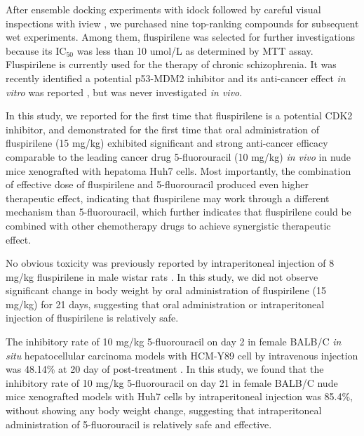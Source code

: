 \documentclass[10pt]{article}
\begin{document}
After ensemble docking experiments with idock \cite{1153,1362} followed by careful visual inspections with iview \cite{1366}, we purchased nine top-ranking compounds for subsequent wet experiments. Among them, fluspirilene was selected for further investigations because its IC$_{50}$ was less than 10 umol/L as determined by MTT assay. Fluspirilene is currently used for the therapy of chronic schizophrenia. It was recently identified a potential p53-MDM2 inhibitor and its anti-cancer effect \textit{in vitro} was reported \cite{1606}, but was never investigated \textit{in vivo}.

In this study, we reported for the first time that fluspirilene is a potential CDK2 inhibitor, and demonstrated for the first time that oral administration of fluspirilene (15 mg/kg) exhibited significant and strong anti-cancer efficacy comparable to the leading cancer drug 5-fluorouracil (10 mg/kg) \textit{in vivo} in nude mice xenografted with hepatoma Huh7 cells. Most importantly, the combination of effective dose of fluspirilene and 5-fluorouracil produced even higher therapeutic effect, indicating that fluspirilene may work through a different mechanism than 5-fluorouracil, which further indicates that fluspirilene could be combined with other chemotherapy drugs to achieve synergistic therapeutic effect.

No obvious toxicity was previously reported by intraperitoneal injection of 8 mg/kg fluspirilene in male wistar rats \cite{1610}. In this study, we did not observe significant change in body weight by oral administration of fluspirilene (15 mg/kg) for 21 days, suggesting that oral administration or intraperitoneal injection of fluspirilene is relatively safe.

The inhibitory rate of 10 mg/kg 5-fluorouracil on day 2 in female BALB/C \textit{in situ} hepatocellular carcinoma models with HCM-Y89 cell by intravenous injection was 48.14\% at 20 day of post-treatment \cite{1609}. In this study, we found that the inhibitory rate of 10 mg/kg 5-fluorouracil on day 21 in female BALB/C nude mice xenografted models with Huh7 cells by intraperitoneal injection was 85.4\%, without showing any body weight change, suggesting that intraperitoneal administration of 5-fluorouracil is relatively safe and effective.

\end{document}

